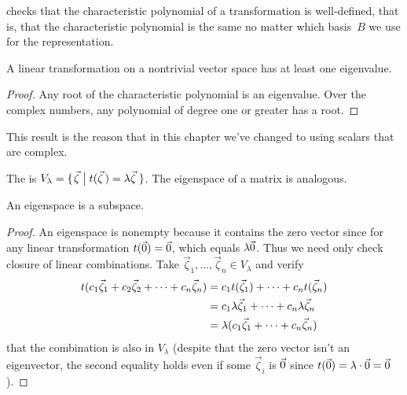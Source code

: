 \noindent {} checks that the 
characteristic polynomial of a transformation is 
well-defined, that is, that the characteristic polynomial is the same
no matter which basis~$B$ we use for the representation.

\begin{lemma} \label{le:MapNonTrivSpHasEigen}
A linear transformation on a nontrivial vector space has at least one
eigenvalue.
\end{lemma}

\begin{proof}
Any root of the characteristic polynomial is an eigenvalue.
Over the complex numbers, any polynomial of degree one or greater
has a root.
\end{proof}

\begin{remark}
This result is the reason that in this chapter 
we've changed to using scalars that are complex.
\end{remark}


\begin{definition}
The 
is
$
  V_{\lambda}=\mbox{$\{\hspace{0.1em}\vec{\zeta}\bigm| t(\vec{\zeta}\,)=\lambda\vec{\zeta}\,\hspace{0.1em}\}$}
$.
The eigenspace of a matrix is analogous.
\end{definition}


\begin{lemma}  \label{le:EigSpaceIsSubSp}
An eigenspace is a subspace.
\end{lemma}

\begin{proof}
An eigenspace is nonempty because it contains the zero
vector since for any linear transformation $t(\vec{0})=\vec{0}$, which equals
$\lambda\vec{0}$. 
Thus we need only check closure of linear combinations.
Take \( \vec{\zeta}_1,\ldots,\vec{\zeta}_n\in V_{\lambda} \) and verify 
\begin{align*}
  t(c_1\vec{\zeta}_1+c_2\vec{\zeta}_2+\cdots +c_n\vec{\zeta}_n)
  &=c_1t(\vec{\zeta}_1)+\dots+c_nt(\vec{\zeta}_n)               \\
  &=c_1\lambda\vec{\zeta}_1+\dots+c_n\lambda\vec{\zeta}_n          \\
  &=\lambda(c_1\vec{\zeta}_1+\dots+c_n\vec{\zeta}_n)
\end{align*}
that the combination is also in $V_{\lambda}$
(despite that the zero vector isn't an eigenvector, 
the second equality holds even if some \( \vec{\zeta}_i \) is \( \vec{0} \) since
\( t(\vec{0})=\lambda\cdot\vec{0}=\vec{0} \)).
\end{proof}

